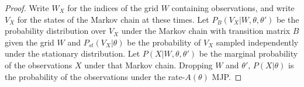 \begin{proof}
Write $W_X$ for the indices of the grid $W$ containing observations, and write $V_X$
for the states of the Markov chain at these times.
Let $P_B(V_X | W, \theta, \theta')$ be the probability distribution over
$V_X$ under the Markov chain with transition matrix $B$ given the grid 
$W$ and $P_{st}(V_X|\theta)$ be the probability of $V_X$ sampled
independently under the stationary distribution. 
Let $P(X | W, \theta, \theta')$ be the marginal probability of the 
observations 
$X$ under that Markov chain. Dropping $W$ and $\theta'$, $P(X|\theta)$
is the probability of the observations under the rate-$A(\theta)$ MJP.


\end{proof}
